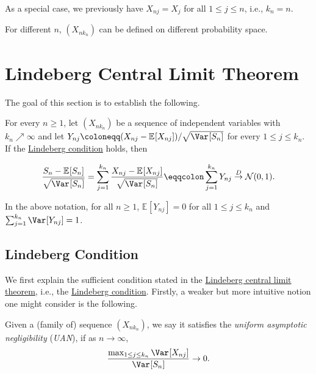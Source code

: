 \begin{eg}
	As a special case, we previously have \(X_{nj} = X_j\) for all \(1 \leq j \leq n\), i.e., \(k_n = n\).
\end{eg}

\begin{remark}
	For different \(n\), \((X_{n k_n})\) can be defined on different probability space.
\end{remark}

\section{Lindeberg Central Limit Theorem}
The goal of this section is to establish the following.

\begin{theorem}\label{thm:Lindeberg-CLT}
	For every \(n \geq 1\), let \((X_{n k_n})\) be a sequence of independent variables with \(k_n \nearrow \infty \) and let \(Y_{nj} \coloneqq (X_{nj} - \mathbb{E}_{}[X_{nj}] ) / \sqrt{\Var_{}[S_n] } \) for every \(1 \leq j \leq k_n\). If the \hyperref[def:Lindeberg-condition]{Lindeberg condition} holds, then

	\[
		\frac{S_n - \mathbb{E}_{}[S_n] }{\sqrt{\Var_{}[S_n] } }
		= \sum_{j=1}^{k_n} \frac{X_{nj} - \mathbb{E}_{}[X_{nj}] }{\sqrt{\Var_{}[S_n] } }
		\eqqcolon \sum_{j=1}^{k_n} Y_{nj}
		\overset{D}{\to} \mathcal{N} (0, 1).
	\]
\end{theorem}

\begin{note}
	In the above notation, for all \(n \geq 1\), \(\mathbb{E}_{}[Y_{nj}] = 0\) for all \(1 \leq j \leq k_n\) and \(\sum_{j=1}^{k_n} \Var_{}[Y_{nj}] = 1\).
\end{note}

\subsection{Lindeberg Condition}
We first explain the sufficient condition stated in the \hyperref[thm:Lindeberg-CLT]{Lindeberg central limit theorem}, i.e., the \hyperref[def:Lindeberg-condition]{Lindeberg condition}. Firstly, a weaker but more intuitive notion one might consider is the following.

\begin{definition}\label{def:uniform-asymptotic-negligibility}
	Given a (family of) sequence \((X_{n k_n})\), we say it satisfies the \emph{uniform asymptotic negligibility} (\emph{UAN}), if as \(n \to \infty \),
	\[
		\frac{\max _{1 \leq j \leq k_n} \Var_{}[X_{nj}] }{\Var_{}[S_n] } \to 0.
	\]
\end{definition}

